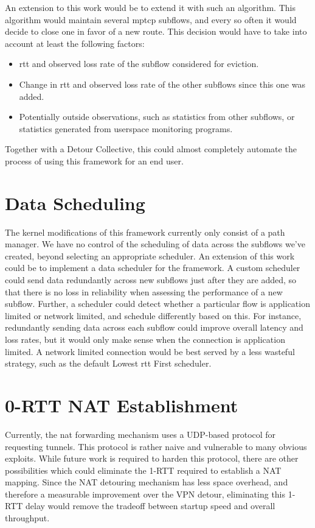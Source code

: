 \documentclass{cwru}
\begin{document}
An extension to this work would be to extend it with such an algorithm. This
algorithm would maintain several \ac{mptcp} subflows, and every so often it
would decide to close one in favor of a new route. This decision would have to
take into account at least the following factors:

\begin{itemize}
\item \ac{rtt} and observed loss rate of the subflow considered for eviction.
\item Change in \ac{rtt} and observed loss rate of the other subflows since this
  one was added.
\item Potentially outside observations, such as statistics from other subflows,
  or statistics generated from userspace monitoring programs.
\end{itemize}

Together with a Detour Collective, this could almost completely automate the
process of using this framework for an end user.

\section{Data Scheduling}

The kernel modifications of this framework currently only consist of a path
manager. We have no control of the scheduling of data across the subflows we've
created, beyond selecting an appropriate scheduler. An extension of this work
could be to implement a data scheduler for the framework. A custom scheduler
could send data redundantly across new subflows just after they are added, so
that there is no loss in reliability when assessing the performance of a new
subflow. Further, a scheduler could detect whether a particular flow is
application limited or network limited, and schedule differently based on this.
For instance, redundantly sending data across each subflow could improve overall
latency and loss rates, but it would only make sense when the connection is
application limited. A network limited connection would be best served by a less
wasteful strategy, such as the default Lowest \ac{rtt} First scheduler.

\section{0-RTT NAT Establishment}
\label{sec:0rtt-nat}

Currently, the \ac{nat} forwarding mechanism uses a UDP-based protocol for
requesting tunnels. This protocol is rather naive and vulnerable to many obvious
exploits. While future work is required to harden this protocol, there are other
possibilities which could eliminate the 1-RTT required to establish a NAT
mapping. Since the NAT detouring mechanism has less space overhead, and
therefore a measurable improvement over the VPN detour, eliminating this 1-RTT
delay would remove the tradeoff between startup speed and overall throughput.
\end{document}
